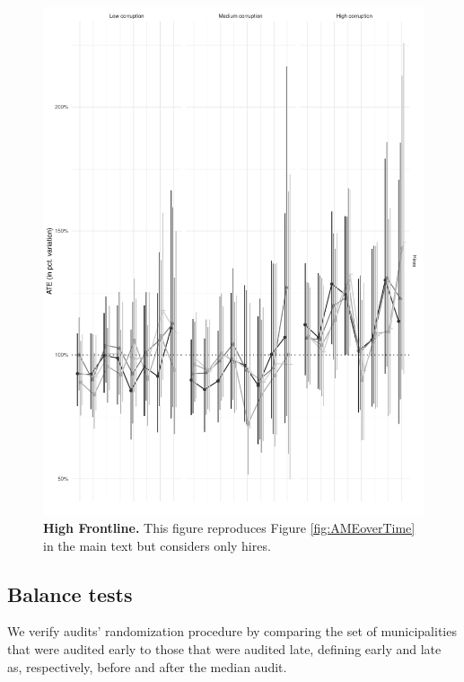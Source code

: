 {\begin{figure}[H]
    \centering
    \includegraphics{chapters/chapter_2/figures/AMEoverTimeHires.pdf}
    \caption{{\bf High Frontline.} This figure reproduces Figure \ref{fig:AMEoverTime} in the main text but considers only hires.}
    \label{fig:AMEoverTimeHires}
\end{figure}

\subsection{Balance tests}
\label{app:balanceRobustness}

We verify audits' randomization procedure by comparing the set of municipalities that were audited early to those that were audited late, defining early and late as, respectively, before and after the median audit. 

}
